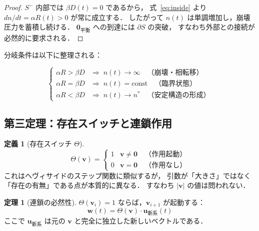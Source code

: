 \documentclass[12pt, a4paper]{article}
\theoremstyle{definition}
\newtheorem{definition}{定義}
\newtheorem{theorem}{定理}
\newcommand{\vzero}{\mathbf{0}}
\newcommand{\vequil}{\mathbf{0}_{\text{平衡}}}
\newcommand{\Switch}{\Theta}
\begin{document}
\begin{proof}
  $S^-$ 内部では $\beta D(t) = 0$ であるから，
  式~\eqref{eq:inside} より $dn/dt = \alpha R(t) > 0$ が常に成立する．
  したがって $n(t)$ は単調増加し，崩壊圧力を蓄積し続ける．
  $\vequil$ への到達には $\partial S$ の突破，
  すなわち外部との接続が必然的に要求される．
\end{proof}

分岐条件は以下に整理される：

\begin{equation}
  \begin{cases}
    \alpha R > \beta D & \Rightarrow\; n(t) \to \infty
      \quad \text{（崩壊・相転移）} \\[4pt]
    \alpha R = \beta D & \Rightarrow\; n(t) = \text{const}
      \quad \text{（臨界状態）} \\[4pt]
    \alpha R < \beta D & \Rightarrow\; n(t) \to n^*
      \quad \text{（安定構造の形成）}
  \end{cases}
  \label{eq:bifurcation}
\end{equation}

\subsection{第三定理：存在スイッチと連鎖作用}

\begin{definition}[存在スイッチ $\Switch$]
  \begin{equation}
    \Switch(\mathbf{v}) =
    \begin{cases}
      1 & \mathbf{v} \neq \vzero \quad \text{（作用起動）} \\
      0 & \mathbf{v} = \vzero \quad \text{（作用なし）}
    \end{cases}
    \label{eq:switch}
  \end{equation}
  これはヘヴィサイドのステップ関数に類似するが，
  引数が「大きさ」ではなく「存在の有無」である点が本質的に異なる．
  すなわち $|\mathbf{v}|$ の値は問われない．
\end{definition}

\begin{theorem}[連鎖の必然性]
  $\Switch(\mathbf{v}_i) = 1$ ならば，$\mathbf{v}_{i+1}$ が起動する：
  \begin{equation}
    \mathbf{w}(t) = \Switch(\mathbf{v}) \cdot \mathbf{u}_{\text{新系}}(t)
    \label{eq:chain}
  \end{equation}
  ここで $\mathbf{u}_{\text{新系}}$ は元の $\mathbf{v}$ と完全に独立した新しいベクトルである．
\end{theorem}
\end{document}
